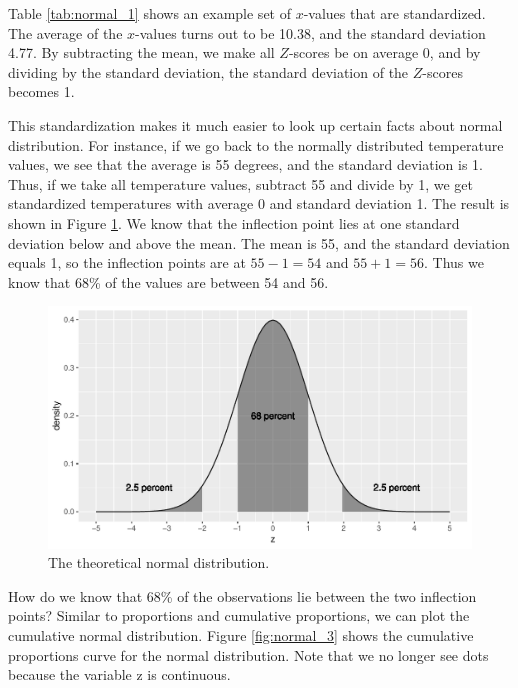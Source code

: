\documentclass[]{report}\usepackage[]{graphicx}\usepackage[]{color}
\makeatletter
\def\maxwidth{ %
  \ifdim\Gin@nat@width>\linewidth
    \linewidth
  \else
    \Gin@nat@width
  \fi
}
\newenvironment{knitrout}{}{} %
\makeatother
\begin{document}
Table \ref{tab:normal_1} shows an example set of $x$-values that are standardized. The average of the $x$-values turns out to be 10.38, and the standard deviation 4.77. By subtracting the mean, we make all $Z$-scores be on average 0, and by dividing by the standard deviation, the standard deviation of the $Z$-scores becomes 1.

This standardization makes it much easier to look up certain facts about normal distribution. For instance, if we go back to the normally distributed temperature values, we see that the average is 55 degrees, and the standard deviation is 1. Thus, if we take all temperature values, subtract 55 and divide by 1, we get standardized temperatures with average 0 and standard deviation 1. The result is shown in Figure \ref{fig:normal_2}. We know that the inflection point lies at one standard deviation below and above the mean. The mean is 55, and the standard deviation equals 1, so the inflection points are at $55-1=54$ and $55+1=56$. Thus we know that 68\% of the values are between 54 and 56.


\begin{knitrout}
\color{fgcolor}\begin{figure}

{\centering \includegraphics[width=\maxwidth]{figure/normal_2-1} 

}

\caption[The theoretical normal distribution]{The theoretical normal distribution.}\label{fig:normal_2}
\end{figure}


\end{knitrout}

How do we know that 68\% of the observations lie between the two inflection points? Similar to proportions and cumulative proportions, we can plot the cumulative normal distribution. Figure \ref{fig:normal_3} shows the cumulative proportions curve for the normal distribution. Note that we no longer see dots because the variable z is continuous.
\end{document}
